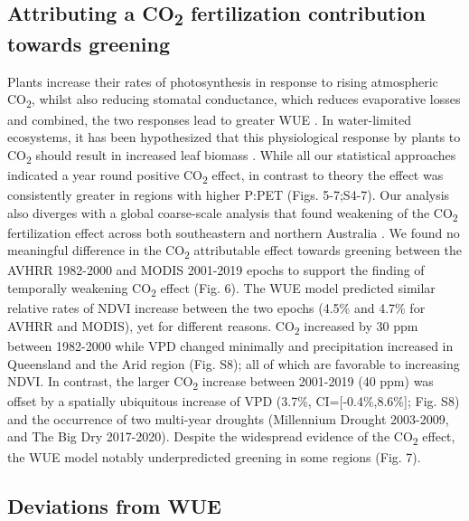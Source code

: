 \documentclass[gc, manuscript]{copernicus}
\begin{document}
\subsection{\texorpdfstring{Attributing a CO\textsubscript{2}
fertilization contribution towards
greening}{Attributing a CO2 fertilization contribution towards greening}}

Plants increase their rates of photosynthesis in response to rising
atmospheric CO\textsubscript{2}, whilst also reducing stomatal
conductance, which reduces evaporative losses and combined, the two
responses lead to greater WUE
\citep{ainsworthResponsePhotosynthesisStomatal2007, morisonSensitivityStomataWater1985}.
In water-limited ecosystems, it has been hypothesized that this
physiological response by plants to CO\textsubscript{2} should result in
increased leaf biomass
\citep{donohueImpactCOFertilization2013b, ukkolaReducedStreamflowWaterstressed2016b}.
While all our statistical approaches indicated a year round positive
CO\textsubscript{2} effect, in contrast to theory the effect was
consistently greater in regions with higher P:PET (Figs. 5-7;S4-7). Our
analysis also diverges with a global coarse-scale analysis that found
weakening of the CO\textsubscript{2} fertilization effect across both
southeastern and northern Australia \citep{wangRecentGlobalDecline2020}.
We found no meaningful difference in the CO\textsubscript{2}
attributable effect towards greening between the AVHRR 1982-2000 and
MODIS 2001-2019 epochs to support the finding of temporally weakening
CO\textsubscript{2} effect (Fig. 6). The WUE model predicted similar
relative rates of NDVI increase between the two epochs (4.5\% and 4.7\%
for AVHRR and MODIS), yet for different reasons. CO\textsubscript{2}
increased by 30 ppm between 1982-2000 while VPD changed minimally and
precipitation increased in Queensland and the Arid region (Fig. S8); all
of which are favorable to increasing NDVI. In contrast, the larger
CO\textsubscript{2} increase between 2001-2019 (40 ppm) was offset by a
spatially ubiquitous increase of VPD (3.7\%, CI={[}-0.4\%,8.6\%{]}; Fig.
S8) and the occurrence of two multi-year droughts (Millennium Drought
2003-2009, and The Big Dry 2017-2020). Despite the widespread evidence
of the CO\textsubscript{2} effect, the WUE model notably underpredicted
greening in some regions (Fig. 7).

\subsection{Deviations from WUE}
\end{document}
